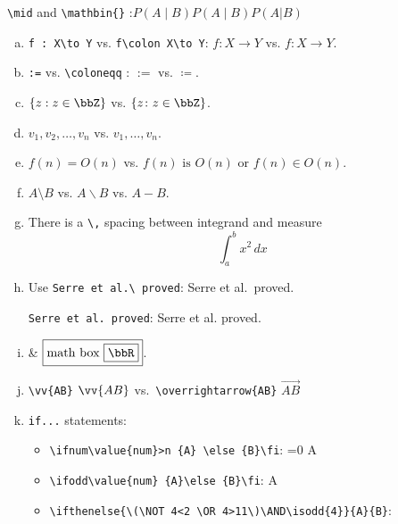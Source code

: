 	\verb|\mid| and \verb|\mathbin{}|	:$ P(A \mid B) P(A \mathbin{\vert} B )  P(A | B)  $
	\begin{enumerate}[(a)]
		\item \verb|f : X\to Y| vs. \verb|f\colon X\to Y|: $ f : X\to Y $ vs. $ f\colon X\to Y $.
		
		\item \verb|:=| vs. \verb|\coloneqq| : $ :=  $ vs. $ \coloneqq $.
		
		\item $ \lbrace z : z \in \bbZ \rbrace $ vs. $ \lbrace z \colon z \in \bbZ \rbrace $.
		
		\item $ v_{1}, v_{2}, \dotsc,v_{n} $ vs. $ v_{1},\dotsc,v_{n} $.
		
		\item $ f(n) = O(n) $ vs. $ f(n) \text{ is } O(n)$ or $ f(n)\in O(n) $.
		
		\item $ A\setminus B $ vs. $ A\backslash B $ vs. $ A-B $.
		
		\item There is a \verb|\,| spacing between integrand and measure
		\[ \int_{a}^{b} x^2 \,dx \]
		
		\item Use \verb|Serre et al.\ proved|: Serre et al.\ proved.
		
		\verb|Serre et al. proved|: Serre et al. proved.
		
		\item {} \& $ \boxed{\text{math box } \boxed{\bbR}} $.
		
		\item \verb|\vv{AB}| $ \vv{AB} $ vs.\ \verb|\overrightarrow{AB}|  $ \overrightarrow{AB} $
		
		\item \verb|if...| statements: 
		\begin{itemize}
			\item \verb|\ifnum\value{num}>n {A} \else {B}\fi|:
			\ifnum\value{num}=0 {A} \fi
			
			\item \verb|\ifodd\value{num} {A}\else {B}\fi|: \ifodd\value{num} {A} \fi
			
			\item \verb||: \ifthenelse{\(\NOT 4<2 \OR 4>11\)\AND\isodd{4}}{A}{B}
		\end{itemize}
		

\end{enumerate}
